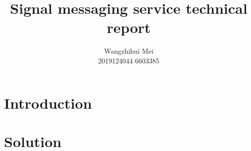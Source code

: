 \documentclass[11pt,en]{elegantpaper}
\title{Signal messaging service technical report}
\author{Wangzhihui Mei \\ 2019124044 6603385}
\institute{CCNU-UOW JI}
\date{}
\begin{document}
\maketitle

\begin{abstract}


\end{abstract}



\section{Introduction}


\section{Solution}
\end{document}
